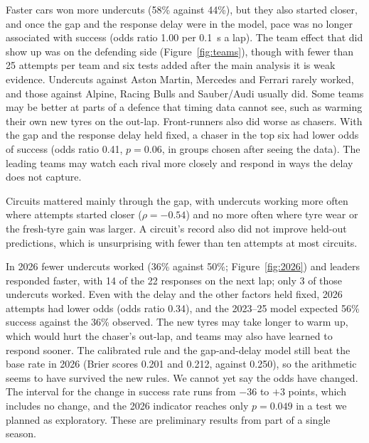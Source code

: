 Faster cars won more undercuts (58\% against 44\%), but they also started closer, and once the gap and the response delay were in the model, pace was no longer associated with success (odds ratio 1.00 per 0.1~s a lap). The team effect that did show up was on the defending side (Figure~\ref{fig:teams}), though with fewer than 25 attempts per team and six tests added after the main analysis it is weak evidence. Undercuts against Aston Martin, Mercedes and Ferrari rarely worked, and those against Alpine, Racing Bulls and Sauber/Audi usually did. Some teams may be better at parts of a defence that timing data cannot see, such as warming their own new tyres on the out-lap. Front-runners also did worse as chasers. With the gap and the response delay held fixed, a chaser in the top six had lower odds of success (odds ratio 0.41, $p=0.06$, in groups chosen after seeing the data). The leading teams may watch each rival more closely and respond in ways the delay does not capture.

Circuits mattered mainly through the gap, with undercuts working more often where attempts started closer ($\rho=-0.54$) and no more often where tyre wear or the fresh-tyre gain was larger. A circuit's record also did not improve held-out predictions, which is unsurprising with fewer than ten attempts at most circuits.

In 2026 fewer undercuts worked (36\% against 50\%; Figure~\ref{fig:2026}) and leaders responded faster, with 14 of the 22 responses on the next lap; only 3 of those undercuts worked. Even with the delay and the other factors held fixed, 2026 attempts had lower odds (odds ratio 0.34), and the 2023--25 model expected 56\% success against the 36\% observed. The new tyres may take longer to warm up, which would hurt the chaser's out-lap, and teams may also have learned to respond sooner. The calibrated rule and the gap-and-delay model still beat the base rate in 2026 (Brier scores 0.201 and 0.212, against 0.250), so the arithmetic seems to have survived the new rules. We cannot yet say the odds have changed. The interval for the change in success rate runs from $-36$ to $+3$ points, which includes no change, and the 2026 indicator reaches only $p=0.049$ in a test we planned as exploratory. These are preliminary results from part of a single season.
